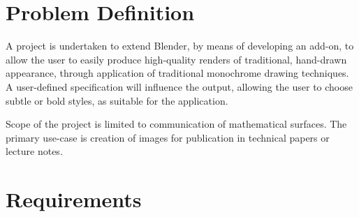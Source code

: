 \section{Problem Definition}

A project is undertaken to extend Blender, by means of developing an add-on, to allow the user to easily produce high-quality renders of traditional, hand-drawn appearance, through application of traditional monochrome drawing techniques.
A user-defined specification will influence the output, allowing the user to choose subtle or bold styles, as suitable for the application.

Scope of the project is limited to communication of mathematical surfaces. The primary use-case is creation of images for publication in technical papers or lecture notes.

\section{Requirements}

